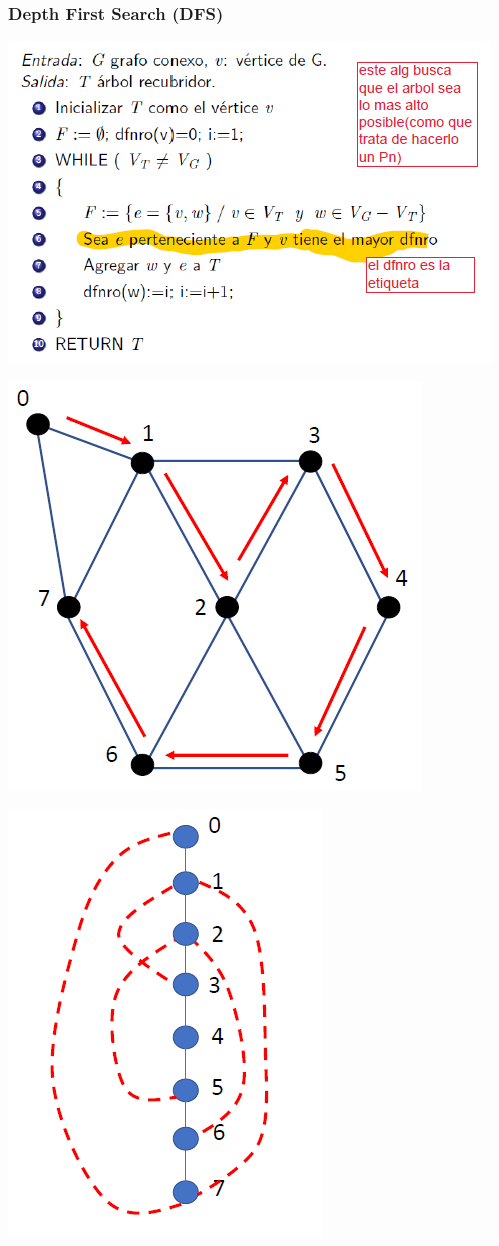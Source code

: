 \documentclass{article}
\begin{document}
\subsubsection{Depth First Search (DFS)}
\begin{center}
    \includegraphics[width=.60\textwidth]{algDFS.PNG}
\end{center}
\begin{minipage}{.5\textwidth}
    \begin{center}
        \includegraphics[width=.60\textwidth]{grafoDFS1.PNG}
    \end{center}
\end{minipage}
\begin{minipage}{.5\textwidth}
    \begin{center}
        \includegraphics[width=.40\textwidth]{grafoDFS2.PNG}
    \end{center}
\end{minipage}
\end{document}
